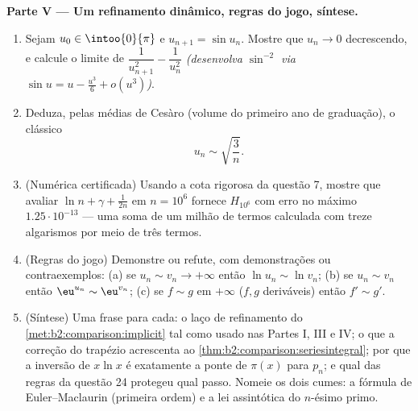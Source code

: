 \begin{problem}
\medskip
\noindent\textbf{Parte V --- Um refinamento dinâmico, regras do
jogo, síntese.}
\begin{enumerate}[resume]
  \item Sejam $u_0 \in \intoo{0}{\pi}$ e $u_{n+1} = \sin u_n$.
        Mostre que $u_n \to 0$ decrescendo, e calcule o limite de
        $\dfrac{1}{u_{n+1}^2} - \dfrac{1}{u_n^2}$ \emph{(desenvolva
        $\sin^{-2}$ via $\sin u = u - \frac{u^3}6 + o(u^3)$)}.
  \item Deduza, pelas médias de Cesàro (volume do primeiro ano de graduação), o clássico
        \[
        u_n \sim \sqrt{\frac{3}{n}} .
        \]
  \item (Numérica certificada) Usando a cota rigorosa da questão 7,
        mostre que avaliar $\ln n + \gamma + \frac1{2n}$ em $n
        = 10^6$ fornece $H_{10^6}$ com erro no máximo
        $1.25\cdot10^{-13}$ --- uma soma de um milhão de termos calculada com
        treze algarismos por meio de três termos.
  \item (Regras do jogo) Demonstre ou refute, com demonstrações ou
        contraexemplos: (a) se $u_n \sim v_n \to +\infty$ então
        $\ln u_n \sim \ln v_n$; (b) se $u_n \sim v_n$ então
        $\eu^{u_n} \sim \eu^{v_n}$; (c) se $f \sim g$ em
        $+\infty$ ($f, g$ deriváveis) então $f' \sim g'$.
  \item (Síntese) Uma frase para cada: o laço de refinamento do
        \cref{met:b2:comparison:implicit} tal como usado nas Partes I,
        III e IV; o que a correção do trapézio acrescenta ao
        \cref{thm:b2:comparison:seriesintegral}; por que a inversão
        de $x\ln x$ é exatamente a ponte de $\pi(x)$ para
        $p_n$; e qual das regras da questão 24 protegeu qual
        passo. Nomeie os dois cumes: a fórmula de Euler--Maclaurin
        (primeira ordem) e a lei assintótica do $n$-ésimo
        primo.
\end{enumerate}
\end{problem}
